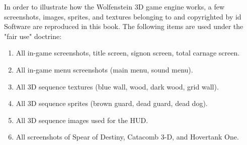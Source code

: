 In order to illustrate how the Wolfenstein 3D game engine works, a few screenshots, images, sprites, and textures belonging to and copyrighted by id Software are reproduced in this book. The following items are used under the "fair use" doctrine:\\
\par
\begin{enumerate}
	\item All in-game screenshots, title screen, signon screen, total carnage screen.
	\item All in-game menu screenshots (main menu, sound menu).
	\item All 3D sequence textures (blue wall, wood, dark wood, grid wall).
    \item All 3D sequence sprites (brown guard, dead guard, dead dog).
    \item All 3D sequence images used for the HUD.
    \item All screenshots of Spear of Destiny, Catacomb 3-D, and Hovertank One.
\end{enumerate}
